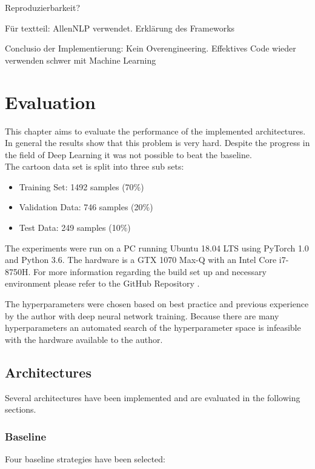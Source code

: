 \documentclass[draft,final,oneside]{vutinfth} %
\begin{document}
Reproduzierbarkeit?

Für textteil: AllenNLP verwendet. Erklärung des Frameworks 

Conclusio der Implementierung: Kein Overengineering. Effektives Code wieder verwenden schwer mit Machine Learning

\chapter{Evaluation}

This chapter aims to evaluate the performance of the implemented architectures. In
general the results show that this problem is very hard. Despite the progress in the field of Deep Learning it was not possible to beat the baseline. \\

The cartoon data set is split into three sub sets:

\begin{itemize}
\item Training Set: 1492 samples (70\%)
\item Validation Data: 746 samples (20\%)
\item Test Data: 249 samples (10\%)
\end{itemize}

The experiments were run on a PC running Ubuntu 18.04 LTS using PyTorch 1.0 and
Python 3.6. The hardware is a GTX 1070 Max-Q with an Intel Core i7-8750H. For more
information regarding the build set up and necessary environment please refer to the GitHub Repository \cite{deephumorrepo}.

The hyperparameters were chosen based on best practice and previous
experience by the author with deep neural network training. Because there are many hyperparameters an automated search of the hyperparameter space is infeasible with the hardware available to the author.

\section{Architectures}
Several architectures have been implemented and are evaluated in the following sections.


\subsection{Baseline}

Four baseline strategies have been selected: 
\end{document}
